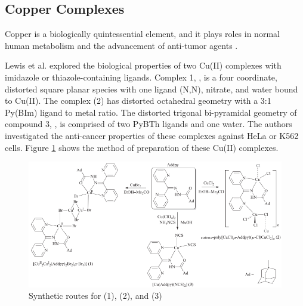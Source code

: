 \subsection{Copper Complexes}
Copper is a biologically quintessential element, and it plays roles in normal human metabolism and the advancement of anti-tumor agents \cite{rajalakshmi2014dna}.

\hspace{0.1cm}Lewis et al. \cite{lewis2016chemical} explored the biological properties of two Cu(II) complexes with imidazole or thiazole-containing ligands. Complex 1, , is a four coordinate, distorted square planar species with one ligand (N,N), nitrate, and water bound to Cu(II). The  complex (2) has distorted octahedral geometry with a 3:1 Py(BIm) ligand to metal ratio. The distorted trigonal bi-pyramidal geometry of compound 3, , is comprised of two PyBTh ligands and one water. The authors investigated the anti-cancer properties of these complexes against HeLa or K562 cells. Figure \ref{fig:coppertwo} shows the method of preparation of these Cu(II) complexes.

\begin{figure}[!ht]
    \centering
    \includegraphics[scale = 0.75]{coppertwo.png}
    \caption{Synthetic routes for  (1),  (2), and  (3)}
    \label{fig:coppertwo}
\end{figure}

